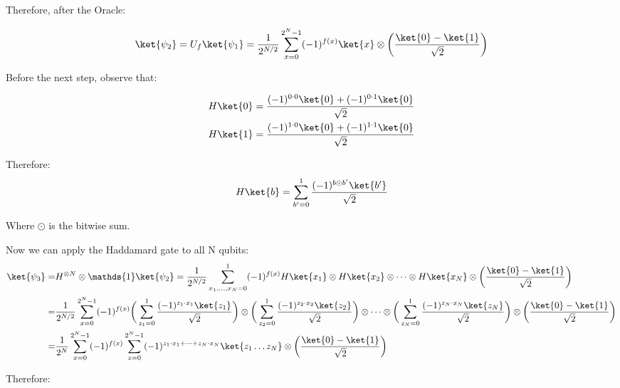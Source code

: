 Therefore, after the Oracle:

\begin{equation}
    \ket{\psi_2} = U_f \ket{\psi_1} = \frac{1}{2^{N/2}} \sum_{x=0}^{2^N -1} (-1)^{f(x)}  \ket{x} \otimes \bigg( \frac{ \ket{0} - \ket{1}}{\sqrt{2}} \bigg)
\end{equation}

Before the next step, observe that:

\begin{equation}
\begin{split}
    H\ket{0} = \frac{(-1)^{0\cdot0}\ket{0} + (-1)^{0 \cdot 1}\ket{0}}{\sqrt{2}} \\
    H\ket{1} = \frac{(-1)^{1 \cdot0} \ket{0} + (-1)^{1\cdot1}\ket{0}}{\sqrt{2}} \\
\end{split}
\end{equation}

Therefore:
\begin{equation}
    H\ket{b} = \sum_{b'=0}^{1}\frac{(-1)^{b \odot b'} \ket{b'} }{\sqrt{2}}
\end{equation}

Where $\odot$ is the bitwise sum.

Now we can apply the Haddamard gate to all N qubits:
\begin{equation}
    \begin{split}
        \ket{\psi_3} = & H^{\otimes N} \otimes \mathds{1} \ket{\psi_2} = \frac{1}{2^{N/2}} \sum_{x_1,\dots, x_N=0}^{1} (-1)^{f(x)}  H\ket{x_1} \otimes H\ket{x_2} \otimes \dots \otimes H\ket{x_N} \otimes \bigg( \frac{ \ket{0} - \ket{1}}{\sqrt{2}} \bigg) \\
        = & \frac{1}{2^{N/2}} \sum_{x=0}^{2^N -1} (-1)^{f(x)}  \bigg( \sum_{z_1=0}^1 \frac{(-1)^{z_1 \cdot x_1} \ket{z_1}}{\sqrt{2}} \bigg) \otimes \bigg( \sum_{z_2=0}^1 \frac{(-1)^{z_2 \cdot x_2} \ket{z_2}}{\sqrt{2}} \bigg) \otimes \dots \otimes \bigg( \sum_{z_N=0}^1 \frac{(-1)^{z_N \cdot x_N} \ket{z_N}}{\sqrt{2}} \bigg) \otimes \bigg( \frac{ \ket{0} - \ket{1}}{\sqrt{2}} \bigg) \\
        = & \frac{1}{2^{N}} \sum_{x=0}^{2^N -1} (-1)^{f(x)}  \sum_{z=0}^{2^N - 1} (-1)^{z_1 \cdot x_1 + \dots + z_N \cdot x_N} \ket{z_1 \dots z_N} \otimes \bigg( \frac{ \ket{0} - \ket{1}}{\sqrt{2}} \bigg) \\
    \end{split}
\end{equation}

Therefore:

